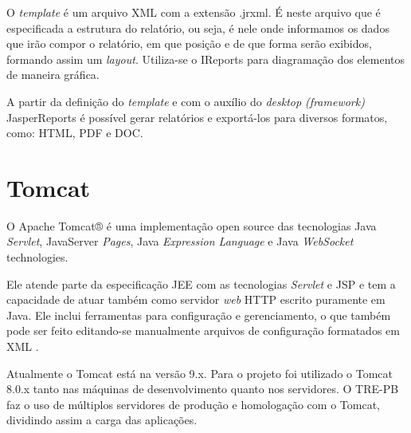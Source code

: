 O \textit{template} é um arquivo XML com a extensão .jrxml. É neste arquivo que é especificada a estrutura do relatório, ou seja, é nele onde informamos os dados que irão compor o relatório, em que posição e de que forma serão exibidos, formando assim um \textit{layout}. Utiliza-se o IReports para diagramação dos elementos de maneira gráfica.

A partir da definição do \textit{template} e com o auxílio do \textit{desktop (framework)} JasperReports é possível gerar relatórios e exportá-los para diversos formatos, como: HTML, PDF e DOC.

\section{Tomcat}
\label{sec:embasamentoTeoricoTomcat}

O Apache Tomcat® é uma implementação open source das tecnologias Java \textit{Servlet}, JavaServer \textit{Pages}, Java \textit{Expression Language} e Java \textit{WebSocket} technologies.

Ele atende parte da especificação JEE com as tecnologias \textit{Servlet} e JSP  e tem a capacidade de atuar também como servidor \textit{web} HTTP escrito puramente em Java. Ele inclui ferramentas para configuração e gerenciamento, o que também pode ser feito editando-se manualmente arquivos de configuração formatados em XML \cite{WikipediaTomcat2018}.

Atualmente o Tomcat está na versão 9.x. Para o projeto foi utilizado o Tomcat 8.0.x tanto nas máquinas de desenvolvimento quanto nos servidores. O TRE-PB faz o uso de múltiplos servidores de produção e homologação com o Tomcat, dividindo assim a carga das aplicações. 

